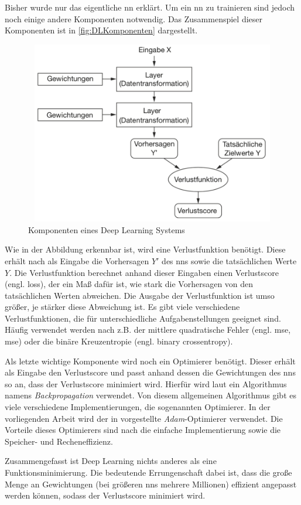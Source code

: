 Bisher wurde nur das eigentliche \acrshort{nn} erklärt.
Um ein \acrshort{nn} zu trainieren sind jedoch noch einige andere Komponenten notwendig.
Das Zusammenspiel dieser Komponenten ist in \autoref{fig:DLKomponenten} dargestellt.

\begin{figure}[h]
    \centering
    \includegraphics[width=1\textwidth,height=8cm,keepaspectratio=true]{content/images/DeepLearningKomponenten.png}
    \caption{Komponenten eines Deep Learning Systems \cite[Abb. 1.9]{DeepLearningPythonKeras}}
    \label{fig:DLKomponenten}
\end{figure}

Wie in der Abbildung erkennbar ist, wird eine Verlustfunktion benötigt.
Diese erhält nach \cite[S. 30]{DeepLearningPythonKeras} als Eingabe die Vorhersagen $Y'$ des \acrshort{nn}s sowie die tatsächlichen Werte $Y$.
Die Verlustfunktion berechnet anhand dieser Eingaben einen Verlustscore (engl. loss), der ein Maß dafür ist, wie stark die Vorhersagen von den tatsächlichen Werten abweichen.
Die Ausgabe der Verlustfunktion ist umso größer, je stärker diese Abweichung ist.
Es gibt viele verschiedene Verlustfunktionen, die für unterschiedliche Aufgabenstellungen geeignet sind.
Häufig verwendet werden nach \cite[S. 155]{DeepLearningPythonKeras} z.B. der mittlere quadratische Fehler (engl. \acrlong{mse}, \acrshort{mse}) oder die binäre Kreuzentropie (engl. binary crossentropy).

Als letzte wichtige Komponente wird noch ein Optimierer benötigt.
Dieser erhält als Eingabe den Verlustscore und passt anhand dessen die Gewichtungen des \acrshort{nn}s so an, dass der Verlustscore minimiert wird.
Hierfür wird laut \cite[S. 30]{DeepLearningPythonKeras} ein Algorithmus namens \emph{Backpropagation} verwendet.
Von diesem allgemeinen Algorithmus gibt es viele verschiedene Implementierungen, die sogenannten Optimierer.
In der vorliegenden Arbeit wird der in \cite{AdamPaper} vorgestellte \emph{Adam}-Optimierer verwendet.
Die Vorteile dieses Optimierers sind nach \cite{AdamPaper} die einfache Implementierung sowie die Speicher- und Recheneffizienz.

Zusammengefasst ist Deep Learning nichts anderes als eine Funktionsminimierung.
Die bedeutende Errungenschaft dabei ist, dass die große Menge an Gewichtungen (bei größeren \acrshort{nn}s mehrere Millionen) effizient angepasst werden können, sodass der Verlustscore minimiert wird.

